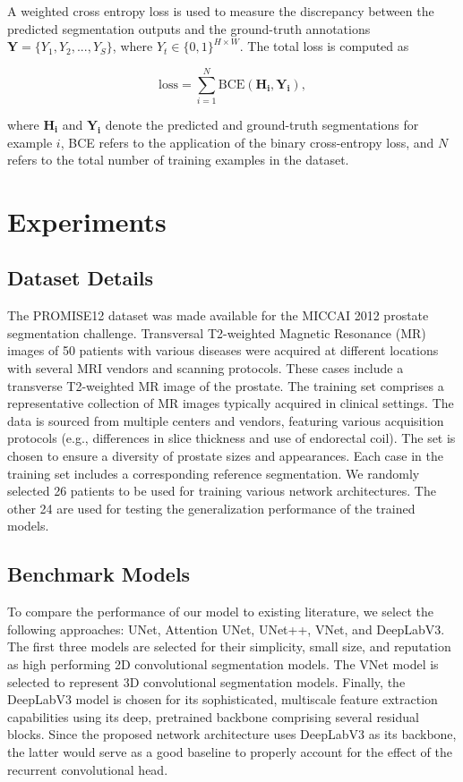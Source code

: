 \documentclass[journal]{IEEEtran}
\begin{document}
A weighted cross entropy loss is used to measure the discrepancy between the predicted segmentation outputs and the ground-truth annotations \( \mathbf{Y} = \{Y_1, Y_2, ..., Y_S\} \), where \(Y_t\in \{0,1\}^{H\times W}\). The total loss is computed as 

\begin{equation}
    \text{loss} = \sum_{i=1}^{N} \text{BCE}(\mathbf{H_{i}}, \mathbf{Y_{i}}),
    \label{eq:loss}
\end{equation}

where \(\mathbf{H_i}\) and \(\mathbf{Y_i}\) denote the predicted and ground-truth segmentations for example $i$, BCE refers to the application of the binary cross-entropy loss, and $N$ refers to the total number of training examples in the dataset.  


\section{Experiments}

\subsection{Dataset Details}
The PROMISE12 \cite{litjens2014evaluation} dataset was made available for the MICCAI 2012 prostate segmentation challenge. Transversal T2-weighted Magnetic Resonance (MR) images of 50 patients with various diseases were acquired at different locations with several MRI vendors and scanning protocols. These cases include a transverse T2-weighted MR image of the prostate. The training set comprises a representative collection of MR images typically acquired in clinical settings. The data is sourced from multiple centers and vendors, featuring various acquisition protocols (e.g., differences in slice thickness and use of endorectal coil). The set is chosen to ensure a diversity of prostate sizes and appearances. Each case in the training set includes a corresponding reference segmentation. We randomly selected 26 patients to be used for training various network architectures. The other 24 are used for testing the generalization performance of the trained models. 

\subsection{Benchmark Models}
To compare the performance of our model to existing literature, we select the following approaches: UNet, Attention UNet, UNet++, VNet, and DeepLabV3. The first three models are selected for their simplicity, small size, and reputation as high performing 2D convolutional segmentation models. The VNet model is selected to represent 3D convolutional segmentation models. Finally, the DeepLabV3 model is chosen for its sophisticated, multiscale feature extraction capabilities using its deep, pretrained backbone comprising several residual blocks. Since the proposed network architecture uses DeepLabV3 as its backbone, the latter would serve as a good baseline to properly account for the effect of the recurrent convolutional head.   
\end{document}
